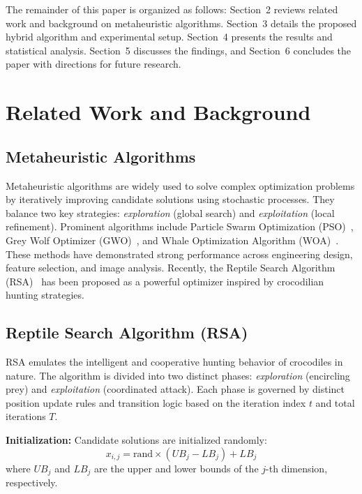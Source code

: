 \documentclass[12pt]{article}
\begin{document}
The remainder of this paper is organized as follows: Section~2 reviews related work and background on metaheuristic algorithms. Section~3 details the proposed hybrid algorithm and experimental setup. Section~4 presents the results and statistical analysis. Section~5 discusses the findings, and Section~6 concludes the paper with directions for future research.


\section{Related Work and Background}

\subsection{Metaheuristic Algorithms}
Metaheuristic algorithms are widely used to solve complex optimization problems by iteratively improving candidate solutions using stochastic processes. They balance two key strategies: \textit{exploration} (global search) and \textit{exploitation} (local refinement). Prominent algorithms include Particle Swarm Optimization (PSO)~\cite{kennedy1995pso}, Grey Wolf Optimizer (GWO)~\cite{mirjalili2014gwo}, and Whale Optimization Algorithm (WOA)~\cite{mirjalili2016woa}. These methods have demonstrated strong performance across engineering design, feature selection, and image analysis. Recently, the Reptile Search Algorithm (RSA)~\cite{abualigah2022rsa} has been proposed as a powerful optimizer inspired by crocodilian hunting strategies.

\subsection{Reptile Search Algorithm (RSA)}
RSA emulates the intelligent and cooperative hunting behavior of crocodiles in nature. The algorithm is divided into two distinct phases: \textit{exploration} (encircling prey) and \textit{exploitation} (coordinated attack). Each phase is governed by distinct position update rules and transition logic based on the iteration index \(t\) and total iterations \(T\).

\textbf{Initialization:} Candidate solutions are initialized randomly:
\begin{equation}
x_{i,j} = \text{rand} \times (UB_j - LB_j) + LB_j
\end{equation}
where \(UB_j\) and \(LB_j\) are the upper and lower bounds of the $j$-th dimension, respectively.
\end{document}
